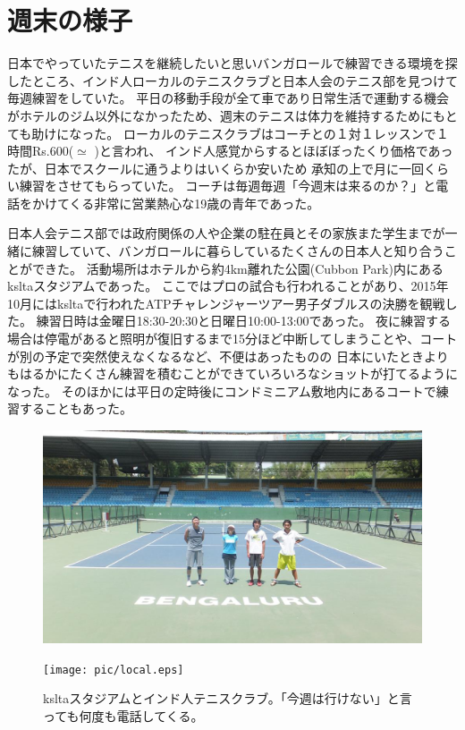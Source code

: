 \section{週末の様子}
日本でやっていたテニスを継続したいと思いバンガロールで練習できる環境を探したところ、インド人ローカルのテニスクラブと日本人会のテニス部を見つけて毎週練習をしていた。
平日の移動手段が全て車であり日常生活で運動する機会がホテルのジム以外になかったため、週末のテニスは体力を維持するためにもとても助けになった。
ローカルのテニスクラブはコーチとの１対１レッスンで１時間Rs.600($\simeq$ )と言われ、
インド人感覚からするとほぼぼったくり価格であったが、日本でスクールに通うよりはいくらか安いため
承知の上で月に一回くらい練習をさせてもらっていた。
コーチは毎週毎週「今週末は来るのか？」と電話をかけてくる非常に営業熱心な19歳の青年であった。
\par
日本人会テニス部では政府関係の人や企業の駐在員とその家族また学生までが一緒に練習していて、バンガロールに暮らしているたくさんの日本人と知り合うことができた。
活動場所はホテルから約4km離れた公園(Cubbon Park)内にある\acrshort{kslta}スタジアムであった。
ここではプロの試合も行われることがあり、2015年10月には\acrshort{kslta}で行われたATPチャレンジャーツアー男子ダブルスの決勝を観戦した。
練習日時は金曜日18:30-20:30と日曜日10:00-13:00であった。
夜に練習する場合は停電があると照明が復旧するまで15分ほど中断してしまうことや、コートが別の予定で突然使えなくなるなど、不便はあったものの
日本にいたときよりもはるかにたくさん練習を積むことができていろいろなショットが打てるようになった。
そのほかには平日の定時後にコンドミニアム敷地内にあるコートで練習することもあった。
\begin{figure}[ht]
  \begin{minipage}{0.5\hsize}
  \begin{center}
    \includegraphics[width=\textwidth]{pic/kslta.eps}
  \end{center}
  \end{minipage}
  \begin{minipage}{0.5\hsize}
  \begin{center}
    \texttt{[image: pic/local.eps]}
  \end{center}
  \end{minipage}
  \caption{\acrshort{kslta}スタジアムとインド人テニスクラブ。「今週は行けない」と言っても何度も電話してくる。}
  \label{wtc}
\end{figure}
